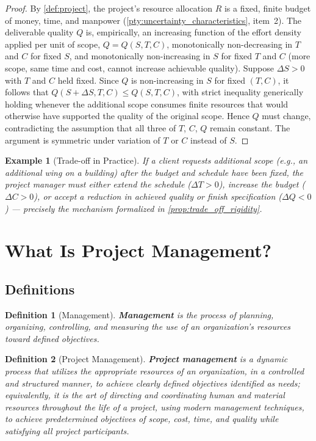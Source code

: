 \documentclass[12pt, a4paper]{report}
\theoremstyle{engnotes}
\newtheorem{defn}{Definition}[section]
\newtheorem{example}{Example}[section]
\begin{document}
\begin{proof}
    By \cref{def:project}, the project's resource allocation $R$ is a fixed, finite budget of money, time, and manpower (\cref{pty:uncertainty_characteristics}, item~2). The deliverable quality $Q$ is, empirically, an increasing function of the effort density applied per unit of scope, $Q = Q(S, T, C)$, monotonically non-decreasing in $T$ and $C$ for fixed $S$, and monotonically non-increasing in $S$ for fixed $T$ and $C$ (more scope, same time and cost, cannot increase achievable quality). Suppose $\Delta S > 0$ with $T$ and $C$ held fixed. Since $Q$ is non-increasing in $S$ for fixed $(T,C)$, it follows that $Q(S+\Delta S, T, C) \leq Q(S,T,C)$, with strict inequality generically holding whenever the additional scope consumes finite resources that would otherwise have supported the quality of the original scope. Hence $Q$ must change, contradicting the assumption that all three of $T$, $C$, $Q$ remain constant. The argument is symmetric under variation of $T$ or $C$ instead of $S$.
\end{proof}

\begin{example}[Trade-off in Practice]\label{ex:trade_off_practice}
    If a client requests additional scope (e.g., an additional wing on a building) after the budget and schedule have been fixed, the project manager must either extend the schedule ($\Delta T > 0$), increase the budget ($\Delta C > 0$), or accept a reduction in achieved quality or finish specification ($\Delta Q < 0$) --- precisely the mechanism formalized in \cref{prop:trade_off_rigidity}.
\end{example}

\section{What Is Project Management?}
\label{sec:what_is_pm}

\subsection{Definitions}
\label{subsec:pm_definitions}

\begin{defn}[Management]\label{def:management}
    \textbf{Management} is the process of planning, organizing, controlling, and measuring the use of an organization's resources toward defined objectives.
\end{defn}

\begin{defn}[Project Management]\label{def:project_management}
    \textbf{Project management} is a dynamic process that utilizes the appropriate resources of an organization, in a controlled and structured manner, to achieve clearly defined objectives identified as needs; equivalently, it is the art of directing and coordinating human and material resources throughout the life of a project, using modern management techniques, to achieve predetermined objectives of scope, cost, time, and quality while satisfying all project participants.
\end{defn}
\end{document}
